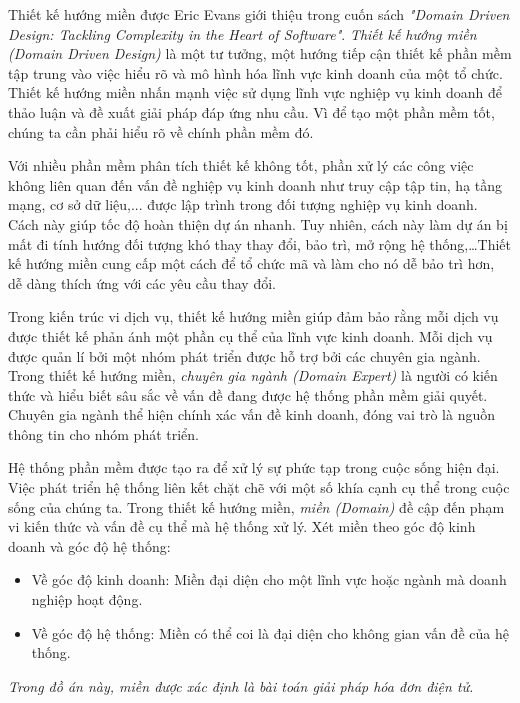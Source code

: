 Thiết kế hướng miền được Eric Evans giới thiệu trong cuốn sách               \textit{"Domain Driven Design: Tackling Complexity in the Heart of Software"}. \emph{Thiết kế hướng miền (Domain Driven Design) }  là một tư tưởng, một hướng tiếp cận   thiết kế phần mềm tập trung vào việc hiểu rõ và mô hình hóa lĩnh vực kinh doanh của một tổ chức.          Thiết kế hướng miền nhấn mạnh việc sử dụng lĩnh vực nghiệp vụ kinh doanh để thảo luận và đề xuất giải pháp đáp ứng nhu cầu. Vì để tạo một phần mềm tốt, chúng ta cần phải hiểu rõ về chính phần mềm đó.

Với nhiều phần mềm phân tích thiết kế  không tốt, phần xử lý các công việc không liên quan đến vấn đề nghiệp vụ kinh doanh như truy cập tập tin, hạ tầng mạng, cơ sở dữ liệu,... được lập trình trong đối tượng nghiệp vụ kinh doanh. Cách này giúp tốc độ hoàn thiện dự án nhanh. Tuy nhiên, cách này làm   dự án  bị mất đi tính hướng đối tượng khó thay  thay đổi, bảo trì, mở rộng hệ thống,\dots        Thiết kế hướng miền  cung cấp một cách để tổ chức mã và làm cho nó dễ bảo trì hơn,  dễ dàng thích ứng với các yêu cầu thay đổi.  

Trong kiến trúc vi dịch vụ, thiết kế hướng miền giúp đảm bảo rằng mỗi dịch vụ được thiết kế phản ánh một phần cụ thể của lĩnh vực kinh doanh. Mỗi dịch vụ được quản lí bởi một nhóm  phát triển được hỗ trợ bởi các chuyên gia ngành.      Trong thiết kế hướng miền, \emph{chuyên gia ngành (Domain Expert)} là người có kiến thức và hiểu biết sâu sắc về vấn đề đang được hệ thống phần mềm giải quyết. Chuyên gia ngành thể hiện chính xác vấn đề kinh doanh, đóng vai trò là nguồn thông tin cho nhóm phát triển.





Hệ thống phần mềm được tạo ra để xử lý sự phức tạp trong cuộc sống hiện đại. Việc phát triển hệ thống liên kết chặt chẽ với một số khía cạnh cụ thể trong cuộc sống của chúng ta.  Trong thiết kế hướng miền,      \emph{miền (Domain)} đề cập đến phạm vi kiến thức và vấn đề cụ thể mà hệ thống xử lý. Xét  miền  theo góc độ kinh doanh và góc độ hệ thống:

\begin{itemize}

    \item Về góc độ kinh doanh: Miền đại diện cho một lĩnh vực hoặc ngành mà doanh nghiệp hoạt động.

    \item Về góc độ hệ thống: Miền có thể coi là đại diện cho không gian vấn đề của hệ thống.

\end{itemize}


\begin{example} \emph{Trong đồ án này, miền được xác định là bài toán giải pháp hóa đơn điện tử.}

\end{example}